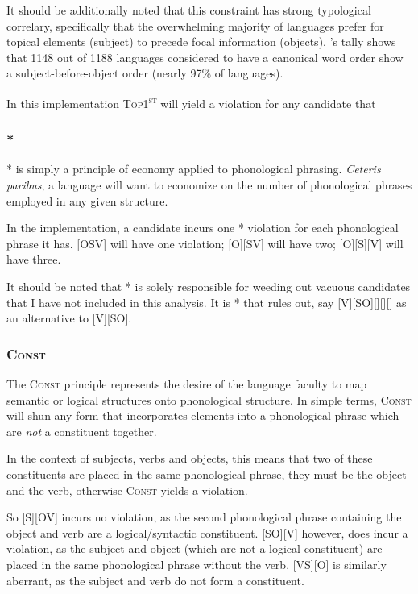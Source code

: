 \documentclass{article}
\newcommand{\cons}{\textsc{Const}}
\newcommand{\topf}{\textsc{Top1\textsuperscript{st}}}
\newcommand{\nophi}{\textsc{*\textphi}}
\begin{document}
It should be additionally noted that this constraint has strong typological correlary, specifically that the overwhelming majority of languages prefer for topical elements (subject) to precede focal information (objects). \textcite{dryer13}'s tally shows that 1148 out of 1188 languages considered to have a canonical word order show a subject-before-object order (nearly 97\% of languages).

In this implementation {\topf} will yield a violation for any candidate that 


\subsubsection{\nophi}

{\nophi} is simply a principle of economy applied to phonological phrasing. \textit{Ceteris paribus}, a language will want to economize on the number of phonological phrases employed in any given structure.

In the implementation, a candidate incurs one {\nophi} violation for each phonological phrase it has. [OSV] will have one violation; [O][SV] will have two; [O][S][V] will have three.

It should be noted that {\nophi} is solely responsible for weeding out vacuous candidates that I have not included in this analysis. It is {\nophi} that rules out, say [V][SO][][][] as an alternative to [V][SO].

\subsubsection{\cons}

The {\cons} principle represents the desire of the language faculty to map semantic or logical structures onto phonological structure. In simple terms, {\cons} will shun any form that incorporates elements into a phonological phrase which are \emph{not} a constituent together.

In the context of subjects, verbs and objects, this means that two of these constituents are placed in the same phonological phrase, they must be the object and the verb, otherwise {\cons} yields a violation.

So [S][OV] incurs no violation, as the second phonological phrase containing the object and verb are a logical/syntactic constituent. [SO][V] 
however, does incur a violation, as the subject and object (which are not a logical constituent) are placed in the same phonological phrase without the verb. [VS][O] is similarly aberrant, as the subject and verb do not form a constituent.
\end{document}

